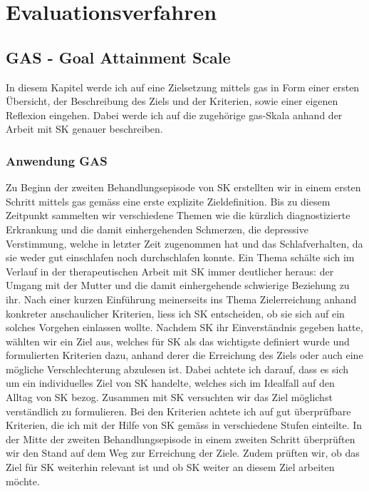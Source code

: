 \section{Evaluationsverfahren}\label{sec:Evaluationsverfahren}

\subsection{GAS - Goal Attainment Scale}
In diesem Kapitel werde ich auf eine Zielsetzung mittels \acf{gas} in Form einer ersten Übersicht, der Beschreibung des Ziels und der Kriterien, sowie einer eigenen Reflexion eingehen. Dabei werde ich auf die zugehörige \ac{gas}-Skala anhand der Arbeit mit SK genauer beschreiben. 

\subsubsection{Anwendung GAS}
Zu Beginn der zweiten Behandlungsepisode von SK erstellten wir in einem ersten Schritt mittels \ac{gas} gemäss  eine erste explizite Zieldefinition. Bis zu diesem Zeitpunkt sammelten wir verschiedene Themen wie die kürzlich diagnostizierte Erkrankung und die damit einhergehenden Schmerzen, die depressive Verstimmung, welche in letzter Zeit zugenommen hat und das Schlafverhalten, da sie weder gut einschlafen noch durchschlafen konnte. Ein Thema schälte sich im Verlauf in der therapeutischen Arbeit mit SK immer deutlicher heraus: der Umgang mit der Mutter und die damit einhergehende schwierige Beziehung zu ihr. Nach einer kurzen Einführung meinerseits ins Thema Zielerreichung anhand konkreter anschaulicher Kriterien, liess ich SK entscheiden, ob sie sich auf ein solches Vorgehen einlassen wollte. Nachdem SK ihr Einverständnis gegeben hatte, wählten wir ein Ziel aus, welches für SK als das wichtigste definiert wurde und formulierten Kriterien dazu, anhand derer die Erreichung des Ziels oder auch eine mögliche Verschlechterung abzulesen ist. Dabei achtete ich darauf, dass es sich um ein individuelles Ziel von SK handelte, welches sich im Idealfall auf den Alltag von SK bezog. Zusammen mit SK versuchten wir das Ziel möglichst verständlich zu formulieren. Bei den Kriterien achtete ich auf gut überprüfbare Kriterien, die ich mit der Hilfe von SK gemäss  in verschiedene Stufen einteilte. In der Mitte der zweiten Behandlungsepisode in einem zweiten Schritt überprüften wir den Stand auf dem Weg zur Erreichung der Ziele. Zudem prüften wir, ob das Ziel für SK weiterhin relevant ist und ob SK weiter an diesem Ziel arbeiten möchte.

